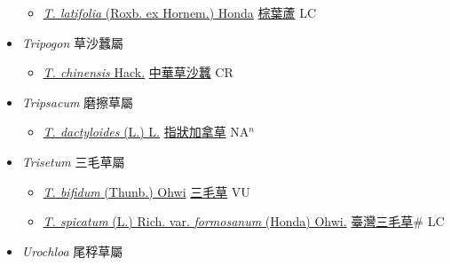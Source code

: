 \begin{itemize}
  \begin{itemize}
        \item[] \href{http://www.theplantlist.org/tpl1.1/search?q=Thysanolaena+latifolia}{\textit{T. latifolia} (Roxb. ex Hornem.) Honda}   \href{\detokenize{http://taibnet.sinica.edu.tw/chi/taibnet_species_list.php?T2=棕葉蘆&T2_new_value=true&fr=y}}{棕葉蘆} LC
  \end{itemize}
 \item[] \textit{Tripogon} 草沙蠶屬
                    
  \begin{itemize}
        \item[] \href{http://www.theplantlist.org/tpl1.1/search?q=Tripogon+chinensis}{\textit{T. chinensis} Hack.}   \href{\detokenize{http://taibnet.sinica.edu.tw/chi/taibnet_species_list.php?T2=中華草沙蠶&T2_new_value=true&fr=y}}{中華草沙蠶} CR
  \end{itemize}
 \item[] \textit{Tripsacum} 磨擦草屬
                    
  \begin{itemize}
        \item[] \href{http://www.theplantlist.org/tpl1.1/search?q=Tripsacum+dactyloides}{\textit{T. dactyloides} (L.) L.}   \href{\detokenize{http://taibnet.sinica.edu.tw/chi/taibnet_species_list.php?T2=指狀加拿草&T2_new_value=true&fr=y}}{指狀加拿草} NA$^n$
  \end{itemize}
 \item[] \textit{Trisetum} 三毛草屬
                    
  \begin{itemize}
        \item[] \href{http://www.theplantlist.org/tpl1.1/search?q=Trisetum+bifidum}{\textit{T. bifidum} (Thunb.) Ohwi}   \href{\detokenize{http://taibnet.sinica.edu.tw/chi/taibnet_species_list.php?T2=三毛草&T2_new_value=true&fr=y}}{三毛草} VU
        \item[] \href{http://www.theplantlist.org/tpl1.1/search?q=Trisetum+spicatum+var.+formosanum}{\textit{T. spicatum} (L.) Rich. var. \textit{formosanum} (Honda) Ohwi.}   \href{\detokenize{http://taibnet.sinica.edu.tw/chi/taibnet_species_list.php?T2=臺灣三毛草&T2_new_value=true&fr=y}}{臺灣三毛草}\# LC
  \end{itemize}
 \item[] \textit{Urochloa} 尾稃草屬
                    

\end{itemize}
